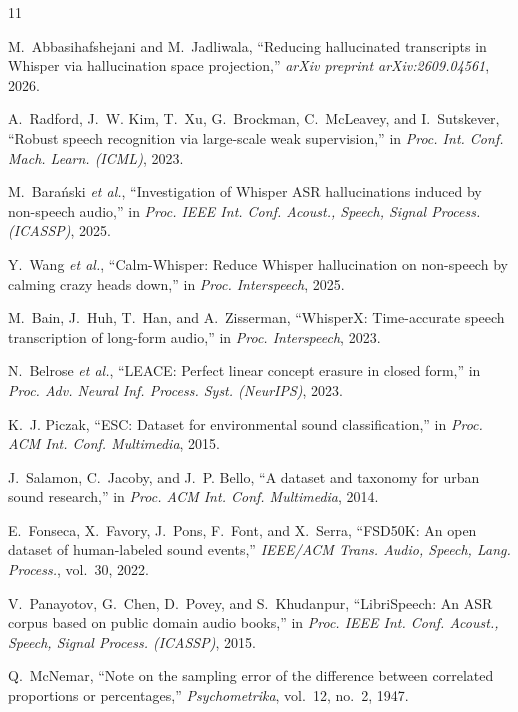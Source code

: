 \documentclass[conference,a4paper]{IEEEtran}
\begin{document}
\begin{thebibliography}{11}

M.~Abbasihafshejani and M.~Jadliwala, ``Reducing hallucinated transcripts in Whisper via hallucination space projection,'' \emph{arXiv preprint arXiv:2609.04561}, 2026.

A.~Radford, J.~W. Kim, T.~Xu, G.~Brockman, C.~McLeavey, and I.~Sutskever, ``Robust speech recognition via large-scale weak supervision,'' in \emph{Proc. Int. Conf. Mach. Learn. (ICML)}, 2023.

M.~Bara\'nski \emph{et al.}, ``Investigation of Whisper ASR hallucinations induced by non-speech audio,'' in \emph{Proc. IEEE Int. Conf. Acoust., Speech, Signal Process. (ICASSP)}, 2025.

Y.~Wang \emph{et al.}, ``Calm-Whisper: Reduce Whisper hallucination on non-speech by calming crazy heads down,'' in \emph{Proc. Interspeech}, 2025.

M.~Bain, J.~Huh, T.~Han, and A.~Zisserman, ``WhisperX: Time-accurate speech transcription of long-form audio,'' in \emph{Proc. Interspeech}, 2023.

N.~Belrose \emph{et al.}, ``LEACE: Perfect linear concept erasure in closed form,'' in \emph{Proc. Adv. Neural Inf. Process. Syst. (NeurIPS)}, 2023.

K.~J. Piczak, ``ESC: Dataset for environmental sound classification,'' in \emph{Proc. ACM Int. Conf. Multimedia}, 2015.

J.~Salamon, C.~Jacoby, and J.~P. Bello, ``A dataset and taxonomy for urban sound research,'' in \emph{Proc. ACM Int. Conf. Multimedia}, 2014.

E.~Fonseca, X.~Favory, J.~Pons, F.~Font, and X.~Serra, ``FSD50K: An open dataset of human-labeled sound events,'' \emph{IEEE/ACM Trans. Audio, Speech, Lang. Process.}, vol.~30, 2022.

V.~Panayotov, G.~Chen, D.~Povey, and S.~Khudanpur, ``LibriSpeech: An ASR corpus based on public domain audio books,'' in \emph{Proc. IEEE Int. Conf. Acoust., Speech, Signal Process. (ICASSP)}, 2015.

Q.~McNemar, ``Note on the sampling error of the difference between correlated proportions or percentages,'' \emph{Psychometrika}, vol.~12, no.~2, 1947.

\end{thebibliography}
\end{document}
